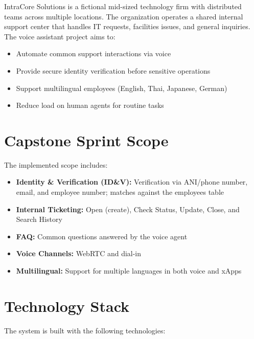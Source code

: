 \documentclass{article}
\begin{document}
IntraCore Solutions is a fictional mid-sized technology firm with distributed teams across multiple locations. The organization operates a shared internal support center that handles IT requests, facilities issues, and general inquiries. The voice assistant project aims to:

\begin{itemize}[noitemsep]
  \item Automate common support interactions via voice
  \item Provide secure identity verification before sensitive operations
  \item Support multilingual employees (English, Thai, Japanese, German)
  \item Reduce load on human agents for routine tasks
\end{itemize}

\section{Capstone Sprint Scope}

The implemented scope includes:

\begin{itemize}[noitemsep]
  \item \textbf{Identity \& Verification (ID\&V):} Verification via ANI/phone number, email, and employee number; matches against the employees table
  \item \textbf{Internal Ticketing:} Open (create), Check Status, Update, Close, and Search History
  \item \textbf{FAQ:} Common questions answered by the voice agent
  \item \textbf{Voice Channels:} WebRTC and dial-in
  \item \textbf{Multilingual:} Support for multiple languages in both voice and xApps
\end{itemize}

\section{Technology Stack}

The system is built with the following technologies:
\end{document}
